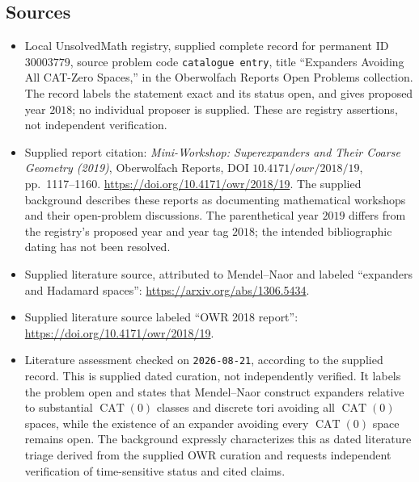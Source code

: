 \documentclass[11pt]{article}
\begin{document}
\subsection{Sources}
\begin{itemize}
\item Local UnsolvedMath registry, supplied complete record for permanent ID \(30003779\), source problem code \texttt{catalogue entry}, title ``Expanders Avoiding All CAT-Zero Spaces,'' in the Oberwolfach Reports Open Problems collection. The record labels the statement exact and its status open, and gives proposed year \(2018\); no individual proposer is supplied. These are registry assertions, not independent verification.
\item Supplied report citation: \emph{Mini-Workshop: Superexpanders and Their Coarse Geometry (2019)}, Oberwolfach Reports, DOI \(10.4171/owr/2018/19\), pp.\ 1117--1160. \url{https://doi.org/10.4171/owr/2018/19}. The supplied background describes these reports as documenting mathematical workshops and their open-problem discussions. The parenthetical year \(2019\) differs from the registry's proposed year and year tag \(2018\); the intended bibliographic dating has not been resolved.
\item Supplied literature source, attributed to Mendel--Naor and labeled ``expanders and Hadamard spaces'': \url{https://arxiv.org/abs/1306.5434}.
\item Supplied literature source labeled ``OWR 2018 report'': \url{https://doi.org/10.4171/owr/2018/19}.
\item Literature assessment checked on \texttt{2026-08-21}, according to the supplied record. This is supplied dated curation, not independently verified. It labels the problem open and states that Mendel--Naor construct expanders relative to substantial \(\operatorname{CAT}(0)\) classes and discrete tori avoiding all \(\operatorname{CAT}(0)\) spaces, while the existence of an expander avoiding every \(\operatorname{CAT}(0)\) space remains open. The background expressly characterizes this as dated literature triage derived from the supplied OWR curation and requests independent verification of time-sensitive status and cited claims.
\end{itemize}
\end{document}
